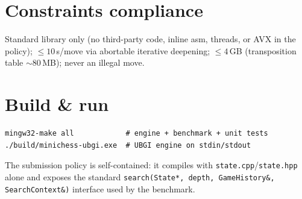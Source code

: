 \documentclass[11pt]{article}
\begin{document}
\section{Constraints compliance}
Standard library only (no third-party code, inline asm, threads, or AVX in the
policy); $\le 10$\,s/move via abortable iterative deepening; $\le 4$\,GB
(transposition table $\sim$80\,MB); never an illegal move.

\section{Build \& run}
\begin{verbatim}
mingw32-make all            # engine + benchmark + unit tests
./build/minichess-ubgi.exe  # UBGI engine on stdin/stdout
\end{verbatim}
The submission policy is self-contained: it compiles with
\texttt{state.cpp}/\texttt{state.hpp} alone and exposes the standard
\texttt{search(State*, depth, GameHistory\&, SearchContext\&)} interface used by
the benchmark.
\end{document}
